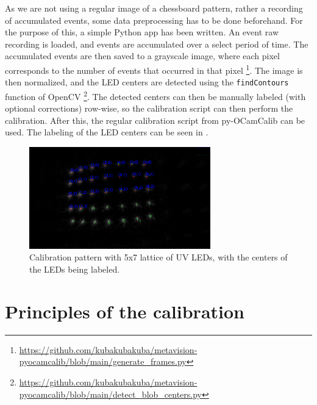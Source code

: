 As we are not using a regular image of a chessboard pattern, rather a recording of accumulated events, some data preprocessing has to be done beforehand.
For the purpose of this, a simple Python app has been written. An event raw recording is loaded, and events are accumulated over a select period of time.
The accumulated events are then saved to a grayscale image, where each pixel corresponds to the number of events that occurred in that
pixel \footnote{\url{https://github.com/kubakubakuba/metavision-pyocamcalib/blob/main/generate_frames.py}}. The image is then normalized,
and the LED centers are detected using the \texttt{findContours} function of OpenCV \footnote{\url{https://github.com/kubakubakuba/metavision-pyocamcalib/blob/main/detect_blob_centers.py}}.
The detected centers can then be manually labeled (with optional corrections) row-wise, so the calibration script can then perform the calibration.
After this, the regular calibration script from py-OCamCalib can be used. The labeling of the LED centers can be seen in .

\begin{figure}[H]
  \centering
  \includegraphics[width=0.7\textwidth]{./fig/photos/lattice_blobs.png}
  \caption{Calibration pattern with 5x7 lattice of UV LEDs, with the centers of the LEDs being labeled.}
  \label{fig:calibration_pattern_labeled}
\end{figure}

\section{Principles of the calibration}

